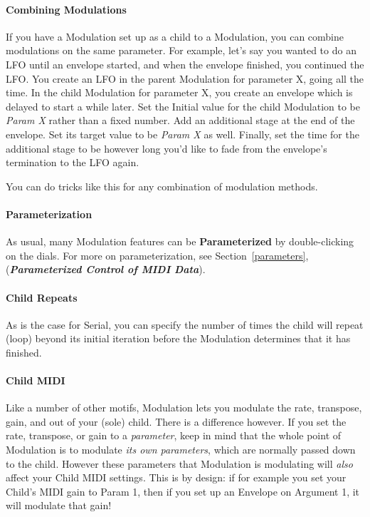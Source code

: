 \documentclass[twoside,10pt]{article}
\begin{document}
\paragraph{Combining Modulations}

If you have a Modulation set up as a child to a Modulation, you can combine modulations on the same parameter.  For example, let's say you wanted to do an LFO until an envelope started, and when the envelope finished, you continued the LFO.  You create an LFO in the parent Modulation for parameter X, going all the time.  In the child Modulation for parameter X, you create an envelope which is delayed to start a while later.  Set the Initial value for the child Modulation to be {\it Param X} rather than a fixed number.  Add an additional stage at the end of the envelope.  Set its target value to be {\it Param X} as well.  Finally, set the time for the additional stage to be however long you'd like to fade from the envelope's termination to the LFO again.

You can do tricks like this for any combination of modulation methods.

\paragraph{Parameterization}

As usual, many Modulation features can be {\bf Parameterized} by double-clicking on the dials.  For more on parameterization, see Section~\ref{parameters}, (\textbf{\textit{Parameterized Control of MIDI Data}}).

\paragraph{Child Repeats}

As is the case for Serial, you can specify the number of times the child will repeat (loop) beyond its initial iteration before the Modulation determines that it has finished.

\paragraph{Child MIDI}

Like a number of other motifs, Modulation lets you modulate the rate, transpose, gain, and out of your (sole) child.  There is a difference however.  If you set the rate, transpose, or gain to a {\it parameter}, keep in mind that the whole point of Modulation is to modulate {\it its own parameters}, which are normally passed down to the child.  However these parameters that Modulation is modulating will {\it also} affect your Child MIDI settings.  This is by design: if for example you set your Child's MIDI gain to Param 1, then if you set up an Envelope on Argument 1, it will modulate that gain!
\end{document}
